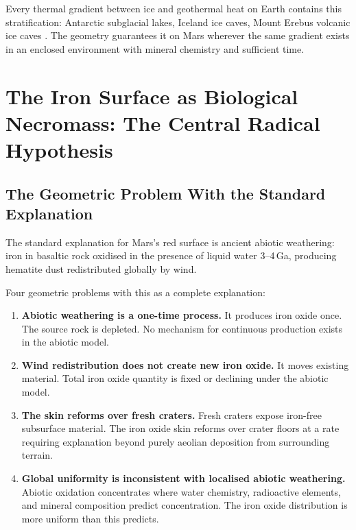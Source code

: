 \documentclass[11pt, a4paper]{article}
\begin{document}
Every thermal gradient between ice and
geothermal heat on Earth contains this
stratification: Antarctic subglacial lakes,
Iceland ice caves, Mount Erebus volcanic
ice caves \cite{boston2004}.
The geometry guarantees it on Mars wherever
the same gradient exists in an enclosed
environment with mineral chemistry and
sufficient time.

\section{The Iron Surface as Biological
Necromass: The Central Radical Hypothesis}

\subsection{The Geometric Problem With
the Standard Explanation}

The standard explanation for Mars's red
surface is ancient abiotic weathering:
iron in basaltic rock oxidised in the
presence of liquid water 3--4\,Ga,
producing hematite dust redistributed
globally by wind.

Four geometric problems with this
as a complete explanation:

\begin{enumerate}[leftmargin=*, label=(\arabic*)]
\item \textbf{Abiotic weathering is a
  one-time process.} It produces iron
  oxide once. The source rock is
  depleted. No mechanism for continuous
  production exists in the abiotic model.

\item \textbf{Wind redistribution does
  not create new iron oxide.}
  It moves existing material.
  Total iron oxide quantity is fixed or
  declining under the abiotic model.

\item \textbf{The skin reforms over fresh
  craters.} Fresh craters expose
  iron-free subsurface material.
  The iron oxide skin reforms over
  crater floors at a rate requiring
  explanation beyond purely aeolian
  deposition from surrounding terrain.

\item \textbf{Global uniformity is
  inconsistent with localised abiotic
  weathering.} Abiotic oxidation
  concentrates where water chemistry,
  radioactive elements, and mineral
  composition predict concentration.
  The iron oxide distribution is
  more uniform than this predicts.
\end{enumerate}
\end{document}
